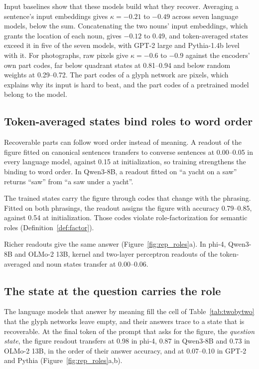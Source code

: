 \documentclass[10pt]{article}
\theoremstyle{plain}
\theoremstyle{remark}
\begin{document}
Input baselines show that these models build what they recover. Averaging a sentence's input embeddings gives $\kappa = -0.21$ to $-0.49$ across seven language models, below the sum. Concatenating the two nouns' input embeddings, which grants the location of each noun, gives $-0.12$ to 0.49, and token-averaged states exceed it in five of the seven models, with GPT-2 large and Pythia-1.4b level with it. For photographs, raw pixels give $\kappa = -0.6$ to $-0.9$ against the encoders' own part codes, far below quadrant states at 0.81--0.94 and below random weights at 0.29--0.72. The part codes of a glyph network are pixels, which explains why its input is hard to beat, and the part codes of a pretrained model belong to the model.

\subsection{Token-averaged states bind roles to word order}
\label{sec:roles}

Recoverable parts can follow word order instead of meaning. A readout of the figure fitted on canonical sentences transfers to converse sentences at 0.00--0.05 in every language model, against 0.15 at initialization, so training strengthens the binding to word order. In Qwen3-8B, a readout fitted on ``a yacht on a saw'' returns ``saw'' from ``a saw under a yacht''.

The trained states carry the figure through codes that change with the phrasing. Fitted on both phrasings, the readout assigns the figure with accuracy 0.79--0.85, against 0.54 at initialization. Those codes violate role-factorization for semantic roles (Definition~\ref{def:factor}).

Richer readouts give the same answer (Figure~\ref{fig:rep_roles}a). In phi-4, Qwen3-8B and OLMo-2 13B, kernel and two-layer perceptron readouts of the token-averaged and noun states transfer at 0.00--0.06.

\subsection{The state at the question carries the role}
\label{sec:behavior}

The language models that answer by meaning fill the cell of Table~\ref{tab:twobytwo} that the glyph networks leave empty, and their answers trace to a state that is recoverable. At the final token of the prompt that asks for the figure, the \emph{question state}, the figure readout transfers at 0.98 in phi-4, 0.87 in Qwen3-8B and 0.73 in OLMo-2 13B, in the order of their answer accuracy, and at 0.07--0.10 in GPT-2 and Pythia (Figure~\ref{fig:rep_roles}a,b).
\end{document}

